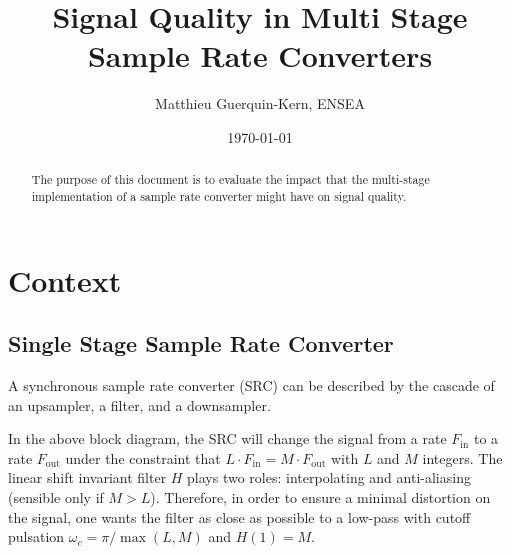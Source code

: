 \documentclass[11pt,a4paper,final]{article}
\author{Matthieu Guerquin-Kern, ENSEA}
\date{\today}
\title{Signal Quality in Multi Stage Sample Rate Converters}
\begin{document}
\maketitle

\begin{abstract}
The purpose of this document is to evaluate the impact that the multi-stage 
implementation of a sample rate converter might have on signal quality.
\end{abstract}

\section{Context}

\subsection{Single Stage Sample Rate Converter}

A synchronous sample rate converter (SRC) can be described by the cascade of an 
upsampler, a filter, and a downsampler.

\begin{center}
\end{center}
In the above block diagram, the SRC will change the signal from a rate 
$F_\text{in}$ to a rate $F_\text{out}$ under the constraint that 
$L\cdot F_\text{in}=M\cdot F_\text{out}$ with $L$ and $M$ integers. The linear 
shift invariant filter $H$ plays two roles: interpolating and anti-aliasing 
(sensible only if $M>L$). Therefore, in order to ensure a minimal distortion on 
the signal, one wants the filter as close as possible to a low-pass with cutoff 
pulsation $\omega_c=\pi/\max(L,M)$ and $H(1)=M$. 
\end{document}
